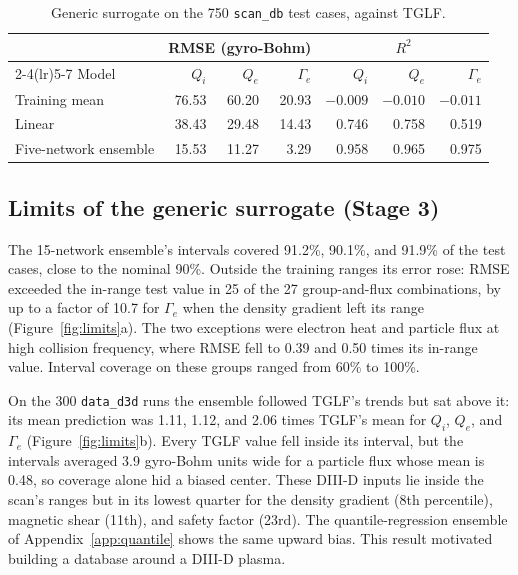 \documentclass[12pt,letterpaper]{article}
\begin{document}
\begin{table}[tbp]
  \centering
  \small
  \begin{tabular}{lrrrrrr}
    \toprule
     & \multicolumn{3}{c}{RMSE (gyro-Bohm)} & \multicolumn{3}{c}{$R^2$} \\
    \cmidrule(lr){2-4}\cmidrule(lr){5-7}
    Model & $Q_i$ & $Q_e$ & $\Gamma_e$ & $Q_i$ & $Q_e$ & $\Gamma_e$ \\
    \midrule
    Training mean & 76.53 & 60.20 & 20.93 & $-0.009$ & $-0.010$ & $-0.011$ \\
    Linear & 38.43 & 29.48 & 14.43 & 0.746 & 0.758 & 0.519 \\
    Five-network ensemble & 15.53 & 11.27 & 3.29 & 0.958 & 0.965 & 0.975 \\
    \bottomrule
  \end{tabular}
  \caption{Generic surrogate on the 750 \texttt{scan\_db} test cases, against TGLF.}
  \label{tab:scandb}
\end{table}

\subsection{Limits of the generic surrogate (Stage 3)}
\label{sec:res-limits}

The 15-network ensemble's intervals covered 91.2\%, 90.1\%, and 91.9\% of the test cases,
close to the nominal 90\%. Outside the training ranges its error rose: RMSE exceeded the
in-range test value in 25 of the 27 group-and-flux combinations, by up to a factor of 10.7
for $\Gamma_e$ when the density gradient left its range (Figure~\ref{fig:limits}a). The two
exceptions were electron heat and particle flux at high collision frequency, where RMSE fell
to 0.39 and 0.50 times its in-range value. Interval coverage on these groups ranged from 60\%
to 100\%.

On the 300 \texttt{data\_d3d} runs the ensemble followed TGLF's trends but sat above it: its
mean prediction was 1.11, 1.12, and 2.06 times TGLF's mean for $Q_i$, $Q_e$, and $\Gamma_e$
(Figure~\ref{fig:limits}b). Every TGLF value fell inside its interval, but the intervals
averaged 3.9 gyro-Bohm units wide for a particle flux whose mean is 0.48, so coverage alone
hid a biased center. These DIII-D inputs lie inside the scan's ranges but in its lowest
quarter for the density gradient (8th percentile), magnetic shear (11th), and safety factor
(23rd). The quantile-regression ensemble of Appendix~\ref{app:quantile} shows the same upward
bias. This result motivated building a database around a DIII-D plasma.
\end{document}
